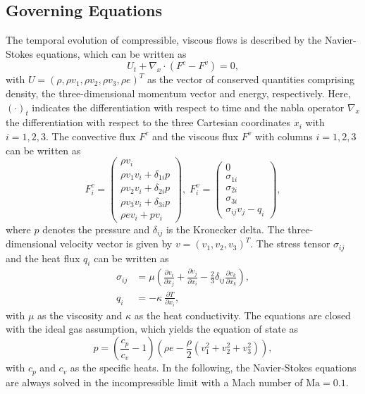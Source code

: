 \subsection{Governing Equations}
\label{sec:equations}
The temporal evolution of compressible, viscous flows is described by the Navier-Stokes equations, which can be written as
\begin{equation}
  U_t + \nabla_x\cdot \left(F^c - F^v\right) = 0,
  \label{eq:navier_stokes}
\end{equation}
with $U=\left(\rho, \rho v_1, \rho v_2, \rho v_3, \rho e \right)^T$ as the vector of conserved quantities comprising density, the three-dimensional momentum vector and energy, respectively.
Here, $(\cdot)_t$ indicates the differentiation with respect to time and the nabla operator $\nabla_x$ the differentiation with respect to the three Cartesian coordinates $x_i$ with $i=1,2,3$.
The convective flux $F^c$ and the viscous flux $F^v$ with columns $i=1,2,3$ can be written as 
\begin{equation}
  F_i^c =
  \left(
  \begin{array}{c}
    \rho v_i \\
    \rho v_1 v_i + \delta_{1i} p\\
    \rho v_2 v_i + \delta_{2i} p\\
    \rho v_3 v_i + \delta_{3i} p\\
    \rho e v_i + p v_i
  \end{array}
  \right)
  ,\;
  F_i^v =
  \left(
  \begin{array}{c}
    0 \\
    \sigma_{1i}\\
    \sigma_{2i}\\
    \sigma_{3i}\\
    \sigma_{ij}v_j-q_i
  \end{array}
  \right) ,
  \label{eq:fluxes_written_out}
\end{equation}
where $p$ denotes the pressure and $\delta_{ij}$ is the Kronecker delta.
The three-dimensional velocity vector is given by $v =(v_1,v_2,v_3)^T$.
The stress tensor $\sigma_{ij}$ and the heat flux $q_i$ can be written as
\begin{align}
  \sigma_{ij} &= \mu\left(\frac{\partial v_i}{\partial x_j}+\frac{\partial v_j}{\partial x_i}-\frac{2}{3}\delta_{ij}\frac{\partial v_k}{\partial x_k}\right) ,
  \label{eq:stress_tensor}\\
  q_i &= - \kappa\:\frac{\partial T}{\partial x_i},
  \label{eq:heat_flux}
\end{align}
with $\mu$ as the viscosity and $\kappa$ as the heat conductivity.
The equations are closed with the ideal gas assumption, which yields the equation of state as
\begin{equation}
  p = \left(\frac{c_p}{c_v}-1\right) \left(\rho e-\frac{\rho}{2}\left(v_1^2+v_2^2+v_3^2\right)\right),
\end{equation}
with $c_p$ and $c_v$ as the specific heats.
In the following, the Navier-Stokes equations are always solved in the incompressible limit with a Mach number of $\mathrm{Ma}=0.1$.



